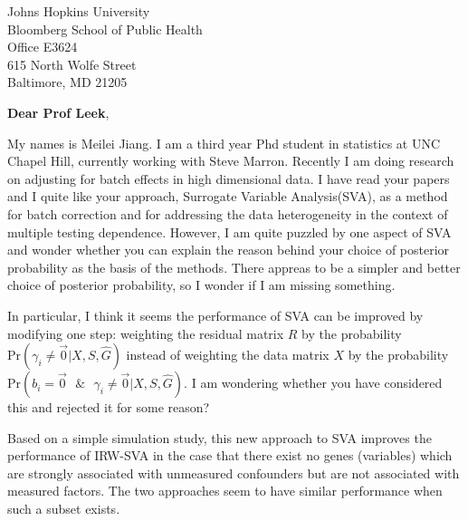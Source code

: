 \documentclass{letter}
\begin{document}

\begin{letter}{Johns Hopkins University \\
                     Bloomberg School of Public Health \\ 
                     Office E3624 \\ 
                     615 North Wolfe Street  \\ 
                     Baltimore, MD 21205} %


\opening{\textbf{Dear Prof Leek},}
 
My names is Meilei Jiang. I am a third year Phd student in statistics at UNC Chapel Hill, currently working with Steve Marron. Recently I am doing research on adjusting for batch effects in high dimensional data. I have read your papers and I quite like your approach, Surrogate Variable Analysis(SVA), as a method for batch correction and for addressing the data heterogeneity in the context of multiple testing dependence. However, I am quite puzzled by one aspect of SVA and wonder whether you can explain the reason behind your choice of posterior probability as the basis of the methods. There appreas to be a simpler and better choice of posterior probability, so I wonder if I am missing something.

In particular, I think it seems the performance of SVA can be improved by modifying one step: weighting the residual matrix $R$ by the probability $\text{Pr}( \gamma_i \neq \vec{0}| X, S, \hat{G})$ instead of weighting the data matrix $X$ by the probability $\text{Pr}(b_i = \vec{0} \text{ } \& \text{ } \gamma_i \neq \vec{0} | X, S, \hat{G})$. I am wondering whether you have considered this and rejected it for some reason?

Based on a simple simulation study, this new approach to SVA improves the performance of IRW-SVA in the case that there exist no genes (variables) which are strongly associated with unmeasured confounders but are not associated with measured factors. The two approaches seem to have similar performance when such a subset exists. 


\end{letter}
\end{document}
